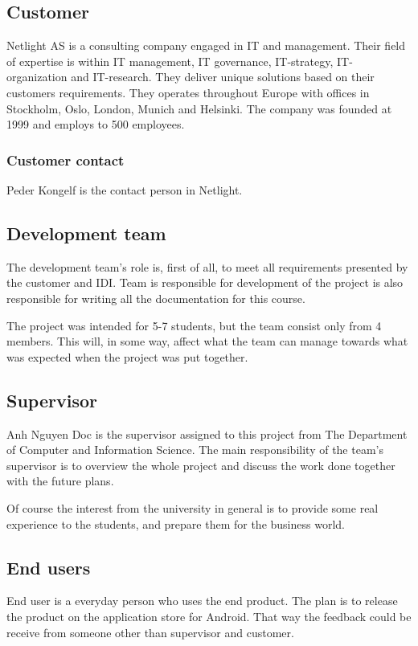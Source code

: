 \subsection{Customer}
Netlight AS is a consulting company engaged in IT and management. Their field of expertise is within IT management, IT governance, IT-strategy, IT-organization and IT-research. They deliver unique solutions based on their customers requirements. They operates throughout Europe with offices in Stockholm, Oslo, London, Munich and Helsinki. The company was founded at 1999 and employs to 500 employees. 
\subsubsection{Customer contact}
Peder Kongelf is the contact person in Netlight.

\subsection{Development team}
The development team's role is, first of all, to meet all requirements presented by the customer and IDI. 
Team is responsible for development of the project is also responsible for writing all the documentation for this course.  
 
The project was intended for 5-7 students, but the team consist only from 4 members. 
This will, in some way, affect what the team can manage towards what was expected when the project was put together.

\subsection{Supervisor}

Anh Nguyen Doc is the supervisor assigned to this project from The Department of Computer and Information Science. 
The main responsibility of the team's supervisor is to overview the whole project and discuss the work done together with the future plans. 

Of course the interest from the university in general is to provide some real experience to the students, and prepare them for the business world.

\subsection{End users}
End user is a everyday person who uses the end product. The plan is to release the product on the application store for Android. That way the feedback could be receive from someone other than supervisor and customer. 

